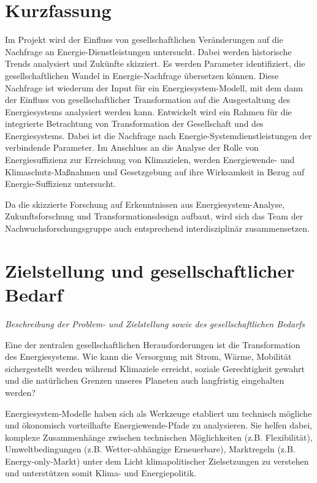\documentclass[a4paper,11pt,twoside]{scrartcl}
\begin{document}
\onehalfspacing

\clearpage


{\singlespacing

}

\setcounter{page}{1}


\section*{Kurzfassung}
Im Projekt wird der Einfluss von gesellschaftlichen Veränderungen auf die Nachfrage an Energie-Dienstleistungen untersucht. Dabei werden historische Trends analysiert und Zukünfte skizziert. Es werden Parameter identifiziert, die gesellschaftlichen Wandel in Energie-Nachfrage übersetzen können. Diese Nachfrage ist wiederum der Input für ein Energiesystem-Modell, mit dem dann der Einfluss von gesellschaftlicher Transformation auf die Ausgestaltung des Energiesystems analysiert werden kann.
Entwickelt wird ein Rahmen für die integrierte Betrachtung von Transformation der Gesellschaft und des Energiesystems. Dabei ist die Nachfrage nach Energie-Systemdienstleistungen der verbindende Parameter. Im Anschluss an die Analyse der Rolle von Energiesuffizienz zur Erreichung von Klimazielen, werden Energiewende- und Klimaschutz-Maßnahmen und Gesetzgebung auf ihre Wirksamkeit in Bezug auf Energie-Suffizienz untersucht.

Da die skizzierte Forschung auf Erkenntnissen aus Energiesystem-Analyse, Zukunftsforschung und Transformationsdesign aufbaut, wird sich das Team der Nachwuchsforschungsgruppe auch entsprechend interdisziplinär zusammensetzen.

 


\section{Zielstellung und gesellschaftlicher Bedarf}
\textit{Beschreibung der Problem- und Zielstellung sowie des gesellschaftlichen Bedarfs}

Eine der zentralen gesellschaftlichen Herausforderungen ist die Transformation des Energiesystems. Wie kann die Versorgung mit Strom, Wärme, Mobilität sichergestellt werden während Klimaziele erreicht, soziale Gerechtigkeit gewahrt und die natürlichen Grenzen unseres Planeten auch langfristig eingehalten werden?

Energiesystem-Modelle haben sich als Werkzeuge etabliert um technisch mögliche und ökonomisch vorteilhafte Energiewende-Pfade zu analysieren. Sie helfen dabei, komplexe Zusammenhänge zwischen technischen Möglichkeiten (z.B. Flexibilität), Umweltbedingungen (z.B. Wetter-abhängige Erneuerbare), Marktregeln (z.B. Energy-only-Markt) unter dem Licht klimapolitischer Zielsetzungen zu verstehen und unterstützen somit Klima- und Energiepolitik.
\end{document}
